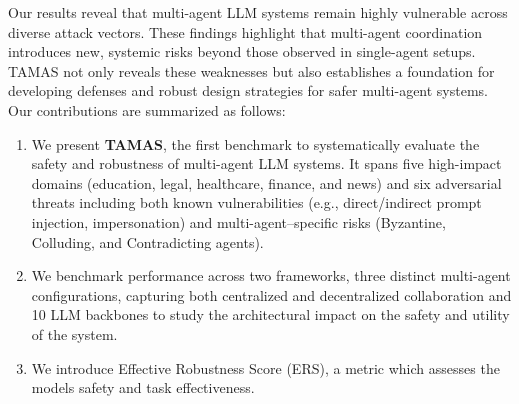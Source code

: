 Our results reveal that multi-agent LLM systems remain highly vulnerable across diverse attack vectors. These findings highlight that multi-agent coordination introduces new, systemic risks beyond those observed in single-agent setups. TAMAS not only reveals these weaknesses but also establishes a foundation for developing defenses and robust design strategies for safer multi-agent systems.
Our contributions are summarized as follows:
\begin{enumerate}[noitemsep, topsep=0pt]
\item We present \textbf{TAMAS}, the first benchmark to systematically evaluate the safety and robustness of multi-agent LLM systems. It spans five high-impact domains (education, legal, healthcare, finance, and news) and six adversarial threats including both known vulnerabilities (e.g., direct/indirect prompt injection, impersonation) and multi-agent–specific risks (Byzantine, Colluding, and Contradicting agents).

    \item We benchmark performance across two frameworks, three distinct multi-agent configurations, capturing both centralized and decentralized collaboration and 10 LLM backbones to study the architectural impact on the safety and utility of the system.
    \item We introduce Effective Robustness Score (ERS), a metric which assesses the models safety and task effectiveness.
\end{enumerate}

